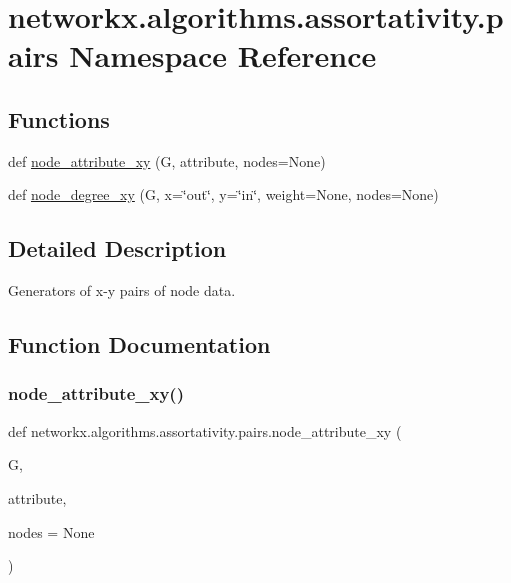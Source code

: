 \hypertarget{namespacenetworkx_1_1algorithms_1_1assortativity_1_1pairs}{}\section{networkx.\+algorithms.\+assortativity.\+pairs Namespace Reference}
\label{namespacenetworkx_1_1algorithms_1_1assortativity_1_1pairs}
\subsection*{Functions}
\begin{DoxyCompactItemize}
\item 
def \hyperlink{namespacenetworkx_1_1algorithms_1_1assortativity_1_1pairs_a768b8f5a471ee6ef846d15ceeb47e919}{node\+\_\+attribute\+\_\+xy} (G, attribute, nodes=None)
\item 
def \hyperlink{namespacenetworkx_1_1algorithms_1_1assortativity_1_1pairs_a168f6a2f4bac098496e44fb31f9c4339}{node\+\_\+degree\+\_\+xy} (G, x=\char`\"{}out\char`\"{}, y=\char`\"{}in\char`\"{}, weight=None, nodes=None)
\end{DoxyCompactItemize}


\subsection{Detailed Description}
\begin{DoxyVerb}Generators of  x-y pairs of node data.\end{DoxyVerb}
 

\subsection{Function Documentation}
\mbox{\label{namespacenetworkx_1_1algorithms_1_1assortativity_1_1pairs_a768b8f5a471ee6ef846d15ceeb47e919}} 
\subsubsection{\texorpdfstring{node\+\_\+attribute\+\_\+xy()}{node\_attribute\_xy()}}
{\footnotesize\ttfamily def networkx.\+algorithms.\+assortativity.\+pairs.\+node\+\_\+attribute\+\_\+xy (\begin{DoxyParamCaption}\item[{}]{G,  }\item[{}]{attribute,  }\item[{}]{nodes = {\ttfamily None} }\end{DoxyParamCaption})}

